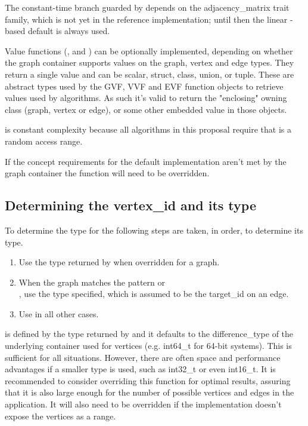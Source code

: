 The constant-time  branch guarded by  depends on the
adjacency\_matrix trait family, which is not yet in the reference implementation; until then the linear -based
default is always used.

Value functions (,  and ) can be optionally implemented, 
depending on whether the graph container supports values on the graph, vertex and edge types. They return a single value and can 
be scalar, struct, class, union, or tuple. These are abstract types used by the GVF, VVF and EVF function objects to retrieve
values used by algorithms. As such it's valid to return the "enclosing" owning class (graph, vertex or edge), or some other
embedded value in those objects.

 is constant complexity because all algorithms in this proposal require that  is a random access range. 

If the concept requirements for the default implementation aren't met by the graph container the function will need to be overridden.

\subsection{Determining the vertex\_id and its type}
To determine the type for  the following steps are taken, in order, to determine its type.
\begin{enumerate}
    \item Use the type returned by  when overridden for a graph.
    \item When the graph matches the pattern  or \\
          ,
          use the  type specified, which is assumed to be the target\_id on an edge.
    \item Use  in all other cases.
\end{enumerate}

 is defined by the type returned by  and it defaults to the difference\_type of the underlying container used for vertices (e.g. int64\_t for 64-bit systems). 
This is sufficient for all situations. However, there are often space and performance advantages if a smaller type is used, such as int32\_t or even int16\_t. It is recommended to consider overriding 
this function for optimal results, assuring that it is also large enough for the number of possible vertices and edges in the application. It will also need to be overridden if the implementation doesn't 
expose the vertices as a range.


